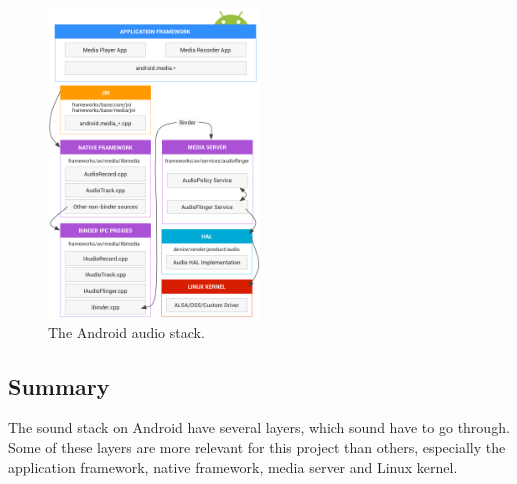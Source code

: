 \begin{figure}[!bht]
    \centering
    \includegraphics[width=0.5\textwidth]{img/sound_stack.png}
    \caption{The Android audio stack\cite{sound_stack}.}
    \label{fig:sound_stack}
\end{figure}

\subsection{Summary}
The sound stack on Android have several layers, which sound have to go through.
Some of these layers are more relevant for this project than others,
especially the application framework, native framework, media server and Linux kernel. 


